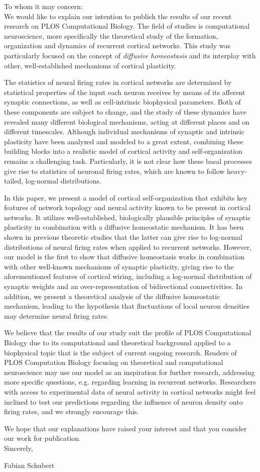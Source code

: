 \documentclass[10pt,a4paper]{article}
\begin{document}
\noindent
To whom it may concern:
\medskip
\\
We would like to explain our intention to publish the results of our recent research on PLOS Computational Biology. The field of studies is computational neuroscience, more specifically the theoretical study of the formation, organization and dynamics of recurrent cortical networks. This study was particularly focused on the concept of \textit{diffusive homeostasis} and its interplay with other, well-established mechanisms of cortical plasticity.

The statistics of neural firing rates in cortical networks are determined by statistical properties of the input each neuron receives by means of its afferent synaptic connections, as well as cell-intrinsic biophysical parameters. Both of these components are subject to change, and the study of these dynamics have revealed many different biological mechanisms, acting at different places and on different timescales. Although individual mechanisms of synaptic and intrinsic plasticity have been analyzed and modeled to a great extent, combining these building blocks into a realistic model of cortical activity and self-organization remains a challenging task. Particularly, it is not clear how these basal processes give rise to statistics of neuronal firing rates, which are known to follow heavy-tailed, log-normal distributions.

In this paper, we present a model of cortical self-organization that exhibits key features of network topology and neural activity known to be present in cortical networks. It utilizes well-established, biologically plausible principles of synaptic plasticity in combination with a diffusive homeostatic mechanism. It has been shown in previous theoretic studies that the latter can give rise to log-normal distributions of neural firing rates when applied to recurrent networks. However, our model is the first to show that diffusive homeostasis works in combination with other well-known mechanisms of synaptic plasticity, giving rise to the aforementioned features of cortical wiring, including a log-normal distribution of synaptic weights and an over-representation of bidirectional connectivities.
In addition, we present a theoretical analysis of the diffusive homeostatic mechanism, leading to the hypothesis that fluctuations of local neuron densities may determine neural firing rates.

We believe that the results of our study suit the profile of PLOS Computational Biology due to its computational and theoretical background applied to a biophysical topic that is the subject of current ongoing research. Readers of PLOS Computation Biology focusing on theoretical and computational neuroscience may use our model as an inspiration for further research, addressing more specific questions, e.g. regarding learning in recurrent networks. Researchers with access to experimental data of neural activity in cortical networks might feel inclined to test our predictions regarding the influence of neuron density onto firing rates, and we strongly encourage this.

We hope that our explanations have raised your interest and that you consider our work for publication.
\medskip
\\
Sincerely,

Fabian Schubert
\end{document}
